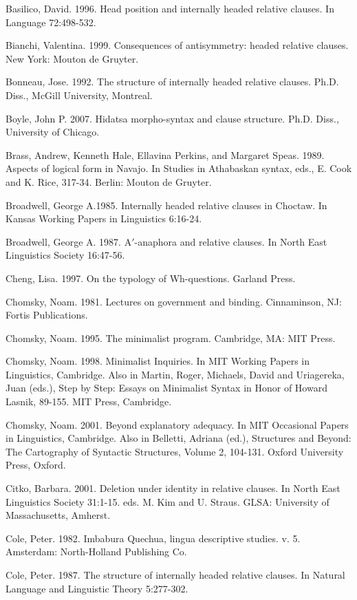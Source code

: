 \documentclass[output=paper]{LSP/langsci}
\begin{document}
\begin{reflist}
Basilico, David. 1996. Head position and internally headed relative clauses. In Language 72:498-532.

Bianchi, Valentina. 1999. Consequences of antisymmetry: headed relative clauses. New York: Mouton de Gruyter.

Bonneau, Jose. 1992. The structure of internally headed relative clauses.  Ph.D. Diss., McGill University, Montreal.

Boyle, John P. 2007. Hidatsa morpho-syntax and clause structure. Ph.D. Diss., University of Chicago.

Brass, Andrew, Kenneth Hale, Ellavina Perkins, and Margaret Speas. 1989. Aspects of logical form in Navajo. In Studies in Athabaskan syntax, eds., E. Cook and K. Rice, 317-34. Berlin: Mouton de Gruyter.

Broadwell, George A.1985. Internally headed relative clauses in Choctaw. In Kansas Working Papers in Linguistics 6:16-24.

Broadwell, George A. 1987. A$'$-anaphora and relative clauses. In North East Linguistics Society 16:47-56.

Cheng, Lisa. 1997. On the typology of Wh-questions. Garland Press.

Chomsky, Noam. 1981. Lectures on government and binding. Cinnaminson, NJ: Fortis Publications.

Chomsky, Noam. 1995. The minimalist program. Cambridge, MA: MIT Press.

Chomsky, Noam. 1998. Minimalist Inquiries. In MIT Working Papers in Linguistics, Cambridge. Also in Martin, Roger, Michaels, David and Uriagereka, Juan (eds.), Step by Step: Essays on Minimalist Syntax in Honor of Howard Lasnik, 89-155. MIT Press, Cambridge.  

Chomsky, Noam. 2001. Beyond explanatory adequacy. In MIT Occasional Papers in Linguistics, Cambridge. Also in Belletti, Adriana (ed.), Structures and Beyond: The Cartography of Syntactic Structures, Volume 2, 104-131. Oxford University Press, Oxford.

Citko, Barbara. 2001. Deletion under identity in relative clauses. In North East Linguistics Society 31:1-15. eds. M. Kim and U. Straus. GLSA: University of Massachusetts, Amherst.

Cole, Peter. 1982. Imbabura Quechua, lingua descriptive studies. v. 5. Amsterdam: North-Holland Publishing Co.

Cole, Peter. 1987. The structure of internally headed relative clauses. In Natural Language and Linguistic Theory 5:277-302. 


\end{reflist}
\end{document}
